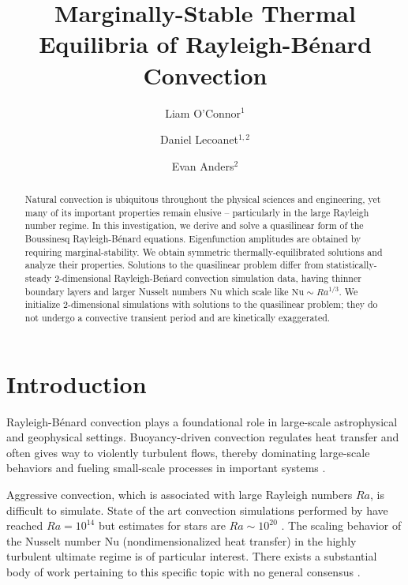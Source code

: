 \documentclass[reprint,amsmath,amssymb,aps]{revtex4-1}
\newcommand\Nu{\mathrm{Nu}}
\begin{document}
\title{Marginally-Stable Thermal Equilibria of Rayleigh-Bénard Convection}

\author{Liam O'Connor$^1$}
\author{Daniel Lecoanet$^{1, 2}$}
\author{Evan Anders$^2$}

\begin{abstract}
Natural convection is ubiquitous throughout the physical sciences and engineering, yet many of its important properties remain elusive -- particularly in the large Rayleigh number regime.
In this investigation, we derive and solve a quasilinear form of the Boussinesq Rayleigh-B\'enard equations. 
Eigenfunction amplitudes are obtained by requiring marginal-stability. We obtain symmetric thermally-equilibrated solutions and analyze their properties. 
Solutions to the quasilinear problem differ from statistically-steady 2-dimensional Rayleigh-Be\'nard convection simulation data, having thinner boundary layers and larger Nusselt numbers $\Nu$ which scale like $\Nu \sim Ra^{1/3}$. 
We initialize 2-dimensional simulations with solutions to the quasilinear problem; they do not undergo a convective transient period and are kinetically exaggerated.
\end{abstract}


\maketitle

\section{Introduction}
Rayleigh-B\'enard convection plays a foundational role in large-scale astrophysical and geophysical settings.
Buoyancy-driven convection regulates heat transfer and often gives way to violently turbulent flows, thereby dominating large-scale behaviors and fueling small-scale processes in important systems \cite{Couston}.

Aggressive convection, which is associated with large Rayleigh numbers $Ra$, is difficult to simulate. 
State of the art convection simulations performed by \cite{Zhu_2018} have reached $Ra = 10^{14}$ but estimates for stars are $Ra \sim 10^{20}$ \cite{Ossendrijver}. 
The scaling behavior of the Nusselt number $\Nu$ (nondimensionalized heat transfer) in the highly turbulent ultimate regime is of particular interest.
There exists a substantial body of work pertaining to this specific topic with no general consensus \cite{Malkus_1954, Howard_1966, Kraichnan, Spiegel, Castaing, Grossman, Ahlers}. 
\end{document}
